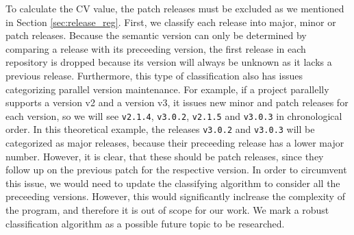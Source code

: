 To calculate the CV value, the patch releases must be excluded as we mentioned in Section \ref{sec:release_reg}. First, we classify each release into major, minor or patch releases. Because the semantic version can only be determined by comparing a release with its preceeding version, the first release in each repository is dropped because its version will always be unknown as it lacks a previous release. Furthermore, this type of classification also has issues categorizing parallel version maintenance. For example, if a project parallelly supports a version v2 and a version v3, it issues new minor and patch releases for each version, so we will see \texttt{v2.1.4}, \texttt{v3.0.2}, \texttt{v2.1.5} and \texttt{v3.0.3} in chronological order. In this theoretical example, the releases \texttt{v3.0.2} and \texttt{v3.0.3} will be categorized as major releases, because their preceeding release has a lower major number. However, it is clear, that these should be patch releases, since they follow up on the previous patch for the respective version. In order to circumvent this issue, we would need to update the classifying algorithm to consider all the preceeding versions. However, this would significantly inclrease the complexity of the program, and therefore it is out of scope for our work. We mark a robust classification algorithm as a possible future topic to be researched.

